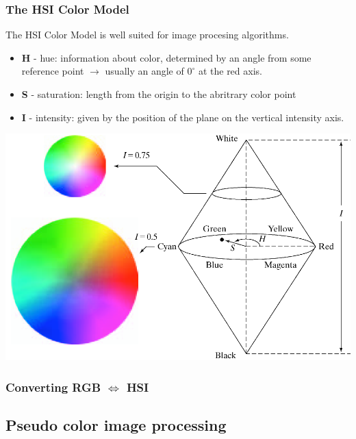 \subsubsection{The HSI Color Model }
The HSI Color Model is well suited for image procesing algorithms.\\
\begin{minipage}{0.6\textwidth}
\begin{itemize}
	\item \textbf{H} - hue: information about color, determined by an angle from some reference point $\rightarrow$ usually an angle of $0^\circ$ at the red axis.
	\item \textbf{S} - saturation: length from the origin to the abritrary color point
	\item \textbf{I} - intensity: given by the position of the plane on the vertical intensity axis.
\end{itemize}
\end{minipage}
\hspace{0.05\textwidth}
\begin{minipage}{0.35\textwidth}
	\includegraphics[width = \textwidth]{./images/HSI_ColorSpace}
\end{minipage}

\subsubsection{Converting RGB $\Leftrightarrow$ HSI }


\subsection{Pseudo color image processing }
